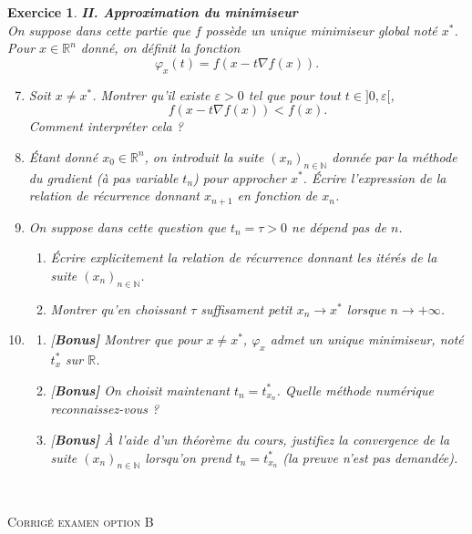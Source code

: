 \documentclass[11pt]{article}
\newcommand{\bR}{\mathbb R}
\newcommand{\bN}{\mathbb N}
\theoremstyle{exostyle}
\newtheorem{exercice}{Exercice}
\begin{document}
\begin{exercice}
{\bf II. Approximation du minimiseur} \\
On suppose dans cette partie que $f$ possède un unique minimiseur global noté $x^*$. Pour $x \in \bR^n$ donné,  on définit la fonction 
 $$ \varphi_x(t) = f(x-t\nabla f(x)).$$
%
\begin{enumerate}
\setcounter{enumi}{6}
%
 \item Soit $x\neq x^*$. Montrer qu'il existe $\varepsilon>0$ tel que pour tout $t\in ]0,\varepsilon[$,
 $$ f(x-t \nabla f(x)) <f(x).$$
 Comment interpréter cela ?
%
\item \'Etant donné $x_0\in \bR^n$, on introduit la suite $(x_n)_{n\in \bN}$ donnée par la méthode du gradient (à pas variable $t_n$) pour approcher $x^*$. \'Ecrire l'expression de la relation de récurrence donnant $x_{n+1}$ en fonction de $x_n$. 
%
\item On suppose dans cette question que $t_n=\tau >0$ ne dépend pas de $n$. 
\begin{enumerate}
   \item \'Ecrire explicitement la relation de récurrence donnant les itérés de la suite $(x_n)_{n\in \bN}$. 
    \item Montrer qu'en choissant $\tau$ suffisament petit   $x_n \to x^*$ lorsque $n\to +\infty$.
\end{enumerate}
 \item 
 \begin{enumerate}
   \item {[\bf Bonus]} Montrer que pour $x\neq x^*$,  $\varphi_x$ admet un unique minimiseur, noté $t^*_x$ sur $\bR$.
    \item {[\bf Bonus]} On  choisit maintenant $t_n =  t^*_{x_n}$. Quelle méthode numérique reconnaissez-vous ?
    \item {[\bf Bonus]} \`A l'aide d'un théorème du cours, justifiez la convergence de la suite $(x_n)_{n\in \bN}$ lorsqu'on prend  $t_n =  t^*_{x_n}$ (la preuve n'est pas demandée).
 \end{enumerate}   
\end{enumerate}
\end{exercice}




\newpage

\noindent {\rule{\textwidth}{.2mm}}\\[-5mm]
\begin{center}
{\large \textsc{Corrigé examen option B} }\\[-5mm]
\end{center}
\noindent {\rule{\textwidth}{.2mm}}\\[1cm]
\end{document}
